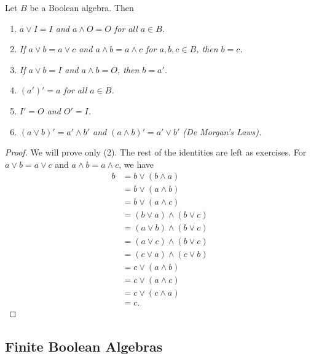  
\begin{theorem}
Let $B$ be a Boolean algebra. Then
\begin{enumerate}
 
\rm \item \it
$a \vee I = I$ and $a \wedge O = O$ for all $a \in B$. 
 
\rm \item \it
If $a \vee b = a \vee c$ and $a \wedge b = a \wedge c$ for $a, b, c
\in B$, then $b = c$.
 
\rm \item \it
If $a \vee b = I$ and $a \wedge b = O$, then $b = a'$.
 
\rm \item \it
$(a')'=a$ for all $a \in B$.
 
\rm \item \it
$I' = O$ and $O' = I$.
 
\rm \item \it
$(a \vee b)' = a' \wedge b'$ and $(a \wedge b)' = a' \vee b'$ (De
Morgan's Laws).
 
\end{enumerate}
\end{theorem}
 
 
\begin{proof}
We will prove only (2). The rest of the identities are left as
exercises. For $a \vee b = a \vee c$ and $a \wedge b = a \wedge c$, we
have  
\begin{align*}
b & = b \vee (b \wedge a)  \\
& =  b \vee (a \wedge b)  \\
& =  b \vee (a \wedge c)  \\
& =  ( b \vee a) \wedge ( b \vee c)  \\
& =  ( a \vee b) \wedge ( b \vee c)  \\
& =  ( a \vee c) \wedge ( b \vee c)  \\
& =  ( c \vee a ) \wedge ( c\vee b )  \\
& = c \vee (a \wedge b) \\
& = c \vee ( a \wedge c ) \\
& = c \vee ( c \wedge a ) \\
& = c.
\end{align*}
\end{proof}
 
 
 
\subsection*{Finite Boolean Algebras}
 

